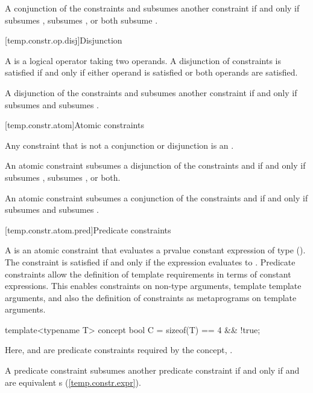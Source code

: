 \pnum
A conjunction of the constraints  
and  subsumes another constraint 
if and only if  subsumes ,
 subsumes , or both subsume
.


[temp.constr.op.disj]{Disjunction}

\pnum
A  is a logical operator taking two 
operands. A disjunction of constraints is satisfied if and only 
if either operand is satisfied or both operands are satisfied. 

\pnum
A disjunction of the constraints  and 
subsumes another constraint  if and only if
 subsumes  and  subsumes
.
          

[temp.constr.atom]{Atomic constraints}

\pnum
Any constraint that is not a conjunction or disjunction is an
.

\pnum
An atomic constraint  subsumes a disjunction
of the constraints  and  if and only
if  subsumes , 
subsumes , or both. 

\pnum
An atomic constraint  subsumes a conjunction
of the constraints  and  if and only
if  subsumes  and 
subsumes .


[temp.constr.atom.pred]{Predicate constraints}

\pnum
A  is an atomic constraint
that evaluates a prvalue constant expression of type 
().
The constraint is satisfied if and only if the expression 
evaluates to .
% 
\enternote
Predicate constraints allow the definition of template requirements
in terms of constant expressions. This enables constraints on non-type
arguments, template template arguments, and also the definition of
constraints as metaprograms on template arguments.
\exitnote

\enterexample
\begin{codeblock}
template<typename T> concept bool C = sizeof(T) == 4 && !true;
\end{codeblock}
Here,  and  are 
predicate constraints required by the concept, .
\exitexample
          

\pnum
A predicate constraint  subsumes another
predicate constraint  if and only if
 and  are equivalent
s
(\ref{temp.constr.expr}).

